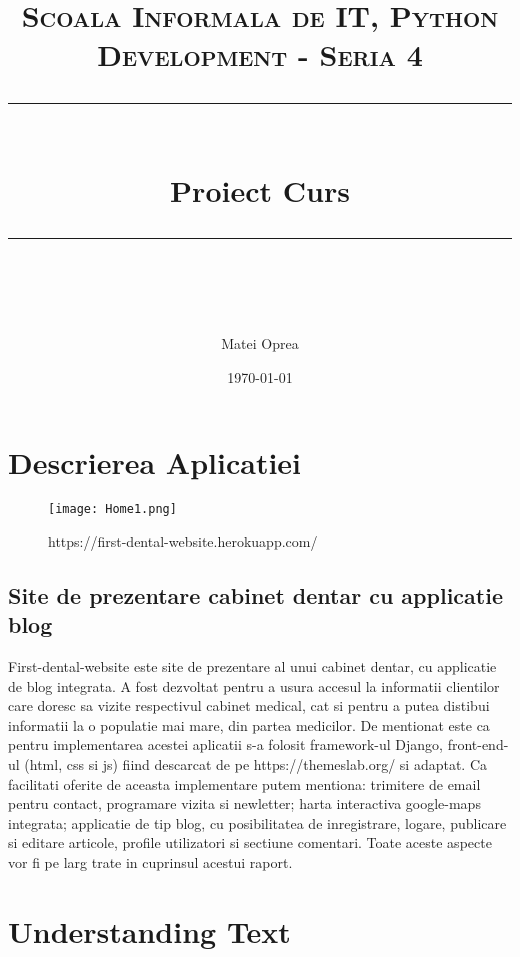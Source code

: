 \documentclass[11pt]{scrartcl} %
\title{	
	\normalfont\normalsize
	\textsc{Scoala Informala de IT, Python Development - Seria 4}\\ %
	\vspace{25pt} %
	\rule{\linewidth}{0.5pt}\\ %
	\vspace{20pt} %
	{\huge Proiect Curs}\\ %
	\vspace{12pt} %
	\rule{\linewidth}{2pt}\\ %
	\vspace{12pt} %
}
\author{\LARGE Matei Oprea} %
\date{\normalsize\today} %
\begin{document}
\maketitle %


\section{Descrierea Aplicatiei}

\begin{figure}[h] %
	\centering
	\texttt{[image: Home1.png]} %
	\caption{https://first-dental-website.herokuapp.com/}
\end{figure}


\subsection{Site de prezentare cabinet dentar cu applicatie blog}

First-dental-website este site de prezentare al unui cabinet dentar, cu applicatie de blog integrata. A fost dezvoltat pentru a usura accesul la informatii clientilor care doresc sa vizite respectivul cabinet medical, cat si pentru a putea distibui informatii la o populatie mai mare, din partea medicilor. De mentionat este ca pentru implementarea acestei aplicatii s-a folosit framework-ul Django, front-end-ul (html, css si js) fiind descarcat de pe https://themeslab.org/ si adaptat. Ca facilitati oferite de aceasta implementare putem mentiona: trimitere de email pentru contact, programare vizita si newletter; harta interactiva google-maps integrata; applicatie de tip blog, cu posibilitatea de inregistrare, logare, publicare si editare articole, profile utilizatori si sectiune comentari. Toate aceste aspecte vor fi pe larg trate in cuprinsul acestui raport. 


\section{Understanding Text}
\end{document}
